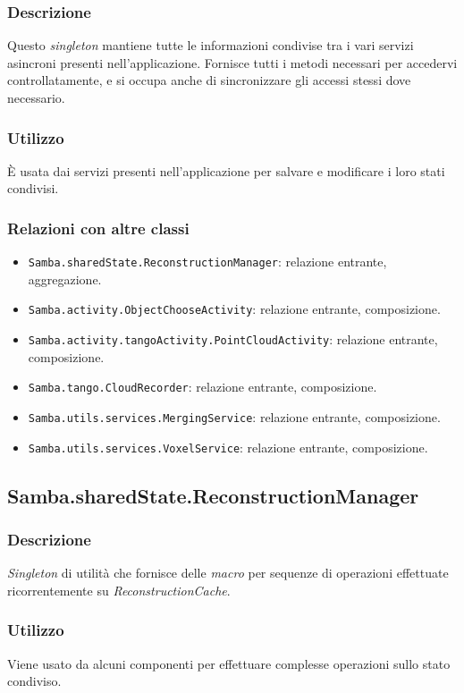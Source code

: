 \subsubsection{Descrizione}
Questo \emph{singleton} mantiene tutte le informazioni condivise tra i vari servizi asincroni presenti nell'applicazione. Fornisce tutti i metodi necessari per accedervi controllatamente, e si occupa anche di sincronizzare gli accessi stessi dove necessario.
\subsubsection{Utilizzo}
È usata dai servizi presenti nell'applicazione per salvare e modificare i loro stati condivisi.
\subsubsection{Relazioni con altre classi}
\begin{itemize}
	\item \texttt{Samba.sharedState.ReconstructionManager}: relazione entrante, aggregazione.
	\item \texttt{Samba.activity.ObjectChooseActivity}: relazione entrante, composizione.
	\item \texttt{Samba.activity.tangoActivity.PointCloudActivity}: relazione entrante, composizione.
	\item \texttt{Samba.tango.CloudRecorder}: relazione entrante, composizione.
	\item \texttt{Samba.utils.services.MergingService}: relazione entrante, composizione.
	\item \texttt{Samba.utils.services.VoxelService}: relazione entrante, composizione.	
\end{itemize}

\subsection{Samba.sharedState.ReconstructionManager}
\subsubsection{Descrizione}
\emph{Singleton} di utilità che fornisce delle \emph{macro} per sequenze di operazioni effettuate ricorrentemente su \emph{ReconstructionCache}.
\subsubsection{Utilizzo}
Viene usato da alcuni componenti per effettuare complesse operazioni sullo stato condiviso.
